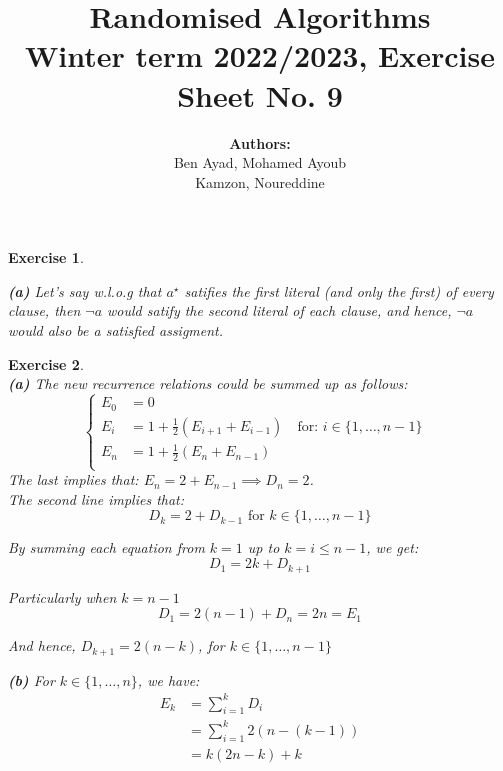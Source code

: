 \documentclass{article}
\title{Randomised Algorithms \\
Winter term 2022/2023, Exercise Sheet No. 9}
\author{
    \textbf{Authors:} \\
    Ben Ayad, Mohamed Ayoub \\
    Kamzon, Noureddine
}
\newtheorem{exo}{Exercise}
\begin{document}
\maketitle


\begin{exo}{\ \\}

\noindent
\textbf{(a)} Let's say w.l.o.g  that $a^\star$ satifies the first literal (and only the first) of every clause, then $\neg{a}$ would satify the second literal of each clause, and hence, $\neg{a}$  would also be a satisfied assigment.


    
\end{exo}
\begin{exo}{\ \\}
\noindent 
\textbf{(a)} The new recurrence relations could be summed up as follows:
\[
\begin{cases}
    E_0 
    &= 0 \\
    E_i 
    &= 1 + \frac{1}{2} (E_{i+1}+E_{i-1})
    \quad \text{for: $i \in \{1, \dots, n-1\}$ }
    \\
    E_n 
    &= 1 + \frac{1}{2} (E_{n}+E_{n-1})\\
\end{cases}
\]
The last implies that: $E_n = 2 +E_{n-1} \implies D_n = 2$.\\   
The second line implies that:
\[
D_k = 2 + D_{k-1} \text{ for } k \in \{1, \dots, n-1\}
\]

By summing each equation from $k=1$ up to $k = i \leq n-1$, we get:
\[
D_1 = 2k + D_{k+1}
\]

Particularly when $k=n-1$
\[
D_1 = 2(n-1) + D_{n} = 2n = E_1
\]

And hence, $D_{k+1} = 2(n-k)$, for $k \in \{1, \dots, n-1\}$
   
\noindent 
\textbf{(b)} For $k \in \{1, \dots, n\}$, we have:
\begin{align*}
E_k 
&= \sum^{k}_{i=1} D_i  \\   
&= \sum^{k}_{i=1} 2(n-(k-1)) \\
&= k (2n -k) + k
\end{align*}


\end{exo}
\end{document}
